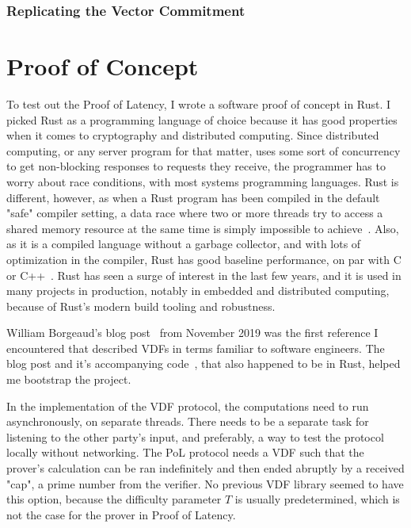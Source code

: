 
\subsection{Replicating the Vector Commitment}

\chapter{Proof of Concept}
\label{Proof of Concept}
To test out the Proof of Latency, I wrote a software proof of concept in Rust. I picked Rust as a programming language of choice because it has good properties when it comes to cryptography and distributed computing. Since distributed computing, or any server program for that matter, uses some sort of concurrency to get non-blocking responses to requests they receive, the programmer has to worry about race conditions, with most systems programming languages. Rust is different, however, as when a Rust program has been compiled in the default "safe" compiler setting, a data race where two or more threads try to access a shared memory resource at the same time is simply impossible to achieve~\cite{The_Rust_Project_Developers2018-xh}. Also, as it is a compiled language without a garbage collector, and with lots of optimization in the compiler, Rust has good baseline performance, on par with C or C++~\cite{Howarth2020-zc}. Rust has seen a surge of interest in the last few years, and it is used in many projects in production, notably in embedded and distributed computing, because of Rust's modern build tooling and robustness.

William Borgeaud's blog post~\cite{Borgeaud2019-wk} from November 2019 was the first reference I encountered that described VDFs in terms familiar to software engineers. The blog post and it's accompanying code~\cite{Borgeaud2019-wk}, that also happened to be in Rust, helped me bootstrap the project.

In the implementation of the VDF protocol, the computations need to run asynchronously, on separate threads. There needs to be a separate task for listening to the other party's input, and preferably, a way to test the protocol locally without networking. The PoL protocol needs a VDF such that the prover's calculation can be ran indefinitely and then ended abruptly by a received "cap", a prime number from the verifier. No previous VDF library seemed to have this option, because the difficulty parameter \(T\) is usually predetermined, which is not the case for the prover in Proof of Latency.


